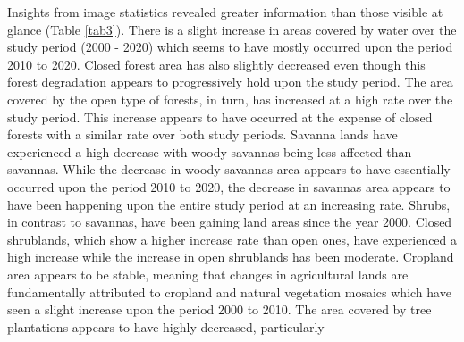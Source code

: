 \documentclass[12pt,oneside,preprint,3p,authoryear,times]{elsarticle} %
\begin{document}
Insights from image statistics revealed greater information than those
visible at glance (Table \ref{tab3}). There is a slight increase in
areas covered by water over the study period (2000 - 2020) which seems
to have mostly occurred upon the period 2010 to 2020. Closed forest area
has also slightly decreased even though this forest degradation appears
to progressively hold upon the study period. The area covered by the
open type of forests, in turn, has increased at a high rate over the
study period. This increase appears to have occurred at the expense of
closed forests with a similar rate over both study periods. Savanna
lands have experienced a high decrease with woody savannas being less
affected than savannas. While the decrease in woody savannas area
appears to have essentially occurred upon the period 2010 to 2020, the
decrease in savannas area appears to have been happening upon the entire
study period at an increasing rate. Shrubs, in contrast to savannas,
have been gaining land areas since the year 2000. Closed shrublands,
which show a higher increase rate than open ones, have experienced a
high increase while the increase in open shrublands has been moderate.
Cropland area appears to be stable, meaning that changes in agricultural
lands are fundamentally attributed to cropland and natural vegetation
mosaics which have seen a slight increase upon the period 2000 to 2010.
The area covered by tree plantations appears to have highly decreased,
particularly
\end{document}
